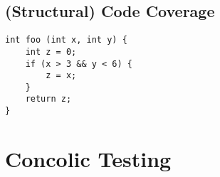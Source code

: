 \subsection{(Structural) Code Coverage}
\begin{lstlisting}[style=C]
int foo (int x, int y) {
	int z = 0;
	if (x > 3 && y < 6) {
		z = x;
	}
	return z; 
}
\end{lstlisting}

\section{Concolic Testing}